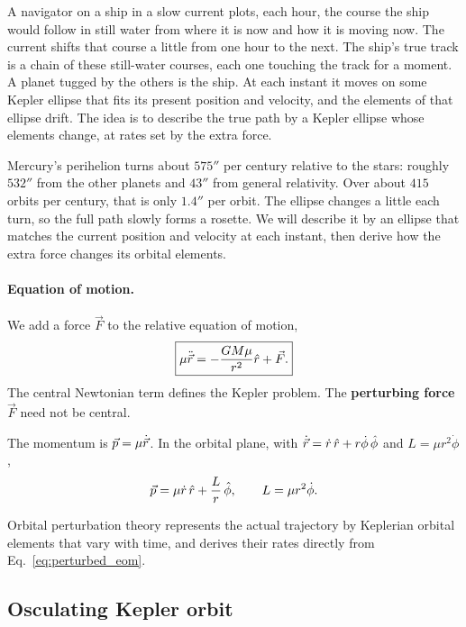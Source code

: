 	A navigator on a ship in a slow current plots, each hour, the course the ship would follow in still water from where it is now and how it is moving now. The current shifts that course a little from one hour to the next. The ship's true track is a chain of these still-water courses, each one touching the track for a moment. 	A planet tugged by the others is the ship. At each instant it moves on some Kepler ellipse that fits its present position and velocity, and the elements of that ellipse drift. The idea is to describe the true path by a Kepler ellipse whose elements change, at rates set by the extra force.

	Mercury's perihelion turns about $575''$ per century relative to the stars: roughly $532''$ from the other planets and $43''$ from general relativity. Over about $415$ orbits per century, that is only $1.4''$ per orbit. The ellipse changes a little each turn, so the full path slowly forms a rosette. We will describe it by an ellipse that matches the current position and velocity at each instant, then derive how the extra force changes its orbital elements.

	\paragraph{Equation of motion.} We add a force $\vec F$ to the relative equation of motion,
	\begin{equation}
		\boxed{
			\mu\ddot{\vec r}
			=
			-\frac{GM\mu}{r^2}\hat r+\vec F .
		}
		\label{eq:perturbed_eom}
	\end{equation}
	The central Newtonian term defines the Kepler problem. The \textbf{perturbing force} $\vec F$ need not be central.
	
	The momentum is $\vec p=\mu\dot{\vec r}$. In the orbital plane, with $\dot{\vec r}=\dot r\,\hat r+r\dot\phi\,\hat\phi$ and $L=\mu r^2\dot\phi$,
	\begin{equation}
		\vec p
		=
		\mu\dot r\,\hat r+\frac{L}{r}\,\hat\phi,
		\qquad
		L=\mu r^2\dot\phi .
		\label{eq:polar_momentum}
	\end{equation}
	
	Orbital perturbation theory represents the actual trajectory by Keplerian orbital elements that vary with time, and derives their rates directly from Eq.~\eqref{eq:perturbed_eom}.
	\subsection{Osculating Kepler orbit}
	\label{sec:osculating_orbit}

